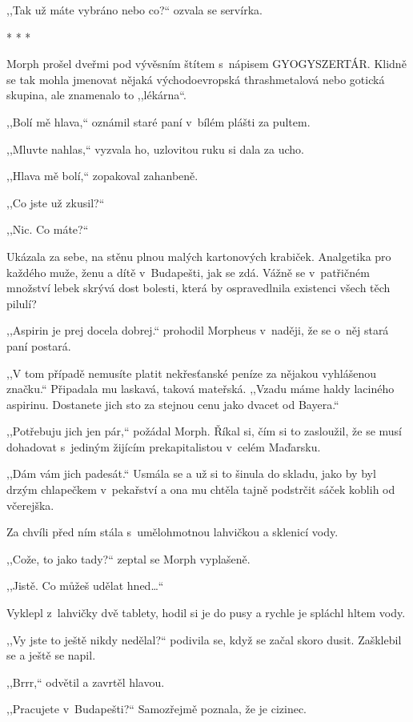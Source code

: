 ,,Tak už máte vybráno nebo co?`` ozvala se servírka.

\begin{center}
* * *
\end{center}

Morph prošel dveřmi pod vývěsním štítem s nápisem GYOGYSZERTÁR. Klidně se tak mohla jmenovat nějaká východoevropská thrashmetalová nebo gotická skupina, ale znamenalo to ,,lékárna``.

,,Bolí mě hlava,`` oznámil staré paní v bílém plášti za pultem.

,,Mluvte nahlas,`` vyzvala ho, uzlovitou ruku si dala za ucho.

,,Hlava mě bolí,`` zopakoval zahanbeně.

,,Co jste už zkusil?``

,,Nic. Co máte?``

Ukázala za sebe, na stěnu plnou malých kartonových krabiček. Analgetika pro každého muže, ženu a dítě v Budapešti, jak se zdá. Vážně se v patřičném množství lebek skrývá dost bolesti, která by ospravedlnila existenci všech těch pilulí?

,,Aspirin je prej docela dobrej.`` prohodil Morpheus v naději, že se o~něj stará paní postará.

,,V tom případě nemusíte platit nekřesťanské peníze za nějakou vyhlášenou značku.`` Připadala mu laskavá, taková mateřská. ,,Vzadu máme haldy laciného aspirinu. Dostanete jich sto za stejnou cenu jako dvacet od Bayera.``

,,Potřebuju jich jen pár,`` požádal Morph. Říkal si, čím si to zasloužil, že se musí dohadovat s jediným žijícím prekapitalistou v celém Maďarsku.

,,Dám vám jich padesát.`` Usmála se a už si to šinula do skladu, jako by byl drzým chlapečkem v pekařství a ona mu chtěla tajně podstrčit sáček koblih od včerejška.

Za chvíli před ním stála s umělohmotnou lahvičkou a sklenicí vody.

,,Cože, to jako tady?`` zeptal se Morph vyplašeně.

,,Jistě. Co můžeš udělat hned\ldots``

Vyklepl z lahvičky dvě tablety, hodil si je do pusy a rychle je spláchl hltem vody.

,,Vy jste to ještě nikdy nedělal?`` podivila se, když se začal skoro dusit. Zašklebil se a ještě se napil.

,,Brrr,`` odvětil a zavrtěl hlavou.

,,Pracujete v Budapešti?`` Samozřejmě poznala, že je cizinec.

